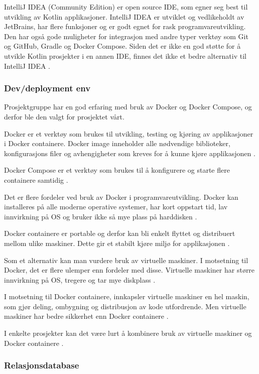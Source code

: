 IntelliJ IDEA (Community Edition) er open source IDE, som egner seg best til utvikling av Kotlin applikasjoner. IntelliJ IDEA er utviklet og vedlikeholdt av JetBrains, har flere funksjoner og er godt egnet for rask programvareutvikling. Den har også gode muligheter for integrasjon med andre typer verktøy som Git og GitHub, Gradle og Docker Compose. Siden det er ikke en god støtte for å utvikle Kotlin prosjekter i en annen IDE, finnes det ikke et bedre alternativ til IntelliJ IDEA \cite{4-jetbrains.com}.  

\subsubsection*{Dev/deployment env}
 
Prosjektgruppe har en god erfaring med bruk av Docker og Docker Compose, og derfor ble den valgt for prosjektet vårt.

Docker er et verktøy som brukes til utvikling, testing og kjøring av applikasjoner i Docker containere. Docker image inneholder alle nødvendige biblioteker, konfigurasjons filer og avhengigheter som kreves for å kunne kjøre applikasjonen \cite{4-cloudacademy.com}.

Docker Compose er et verktøy som brukes til å konfigurere og starte flere containere samtidig \cite{4-kode24.no}.

Det er flere fordeler ved bruk av Docker i programvareutvikling. Docker kan installeres på alle moderne operative systemer, har kort oppstart tid, lav innvirkning på OS og bruker ikke så mye plass på harddisken \cite{4-docker.com}.

Docker containere er portable og derfor kan bli enkelt flyttet og distribuert mellom ulike maskiner. Dette gir et stabilt kjøre miljø for applikasjonen \cite{4-circleci.com}.

Som et alternativ kan man vurdere bruk av virtuelle maskiner. I motsetning til Docker, det er flere ulemper enn fordeler med disse. Virtuelle maskiner har større innvirkning på OS, tregere og tar mye diskplass \cite{4-docker.com}.

I motsetning til Docker containere, innkapsler virtuelle maskiner en hel maskin, som gjør deling, ombygning og distribusjon av kode utfordrende. Men virtuelle maskiner har bedre sikkerhet enn Docker containere \cite{4-circleci.com}.

I enkelte prosjekter kan det være lurt å kombinere bruk av virtuelle maskiner og Docker containere \cite{4-circleci.com}.
\subsubsection*{Relasjonsdatabase}
 

